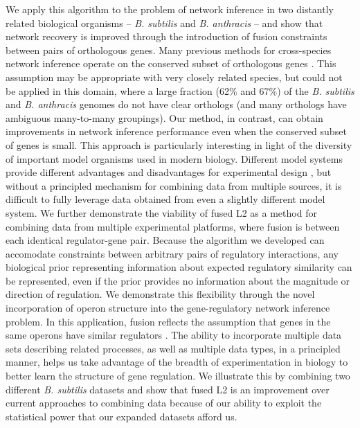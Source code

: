 \documentclass[11pt]{article}
\begin{document}
We apply this algorithm to the problem of network inference in two distantly related biological organisms -- \textit{B. subtilis} and \textit{B. anthracis} -- and show that network recovery is improved through the introduction of fusion constraints between pairs of orthologous genes. 
Many previous methods for cross-species network inference operate on the conserved subset of orthologous genes \cite{dillman_comparative_2015}. 
This assumption may be appropriate with very closely related species, but could not be applied in this domain, where a large fraction (62\% and 67\%) of the \textit{B. subtilis} and \textit{B. anthracis} genomes do not have clear orthologs (and many orthologs have ambiguous many-to-many groupings). 
Our method, in contrast, can obtain improvements in network inference performance even when the conserved subset of genes is small. 
This approach is particularly interesting in light of the diversity of important model organisms used in modern biology. 
Different model systems provide different advantages and disadvantages for experimental design \cite{stolfi_genetic_2012}, but without a principled mechanism for combining data from multiple sources, it is difficult to fully leverage data obtained from even a slightly different model system. 
We further demonstrate the viability of fused L2 as a method for combining data from multiple experimental platforms, where fusion is between each identical regulator-gene pair. 
Because the algorithm we developed can accomodate constraints between arbitrary pairs of regulatory interactions, any biological prior representing information about expected regulatory similarity can be represented, even if the prior provides no information about the magnitude or direction of regulation. 
We demonstrate this flexibility through the novel incorporation of operon structure into the gene-regulatory network inference problem. 
In this application, fusion reflects the assumption that genes in the same operons have similar regulators \cite{lawrence_shared_2002}. 
The ability to incorporate multiple data sets describing related processes, as well as multiple data types, in a principled manner, helps us take advantage of the breadth of experimentation in biology to better learn the structure of gene regulation. 
We illustrate this by combining two different \textit{B. subtilis} datasets and show that fused L2 is an improvement over current approaches to combining data \cite{marbach_revealing_2010} because of our ability to exploit the statistical power that our expanded datasets afford us. 
\end{document}
